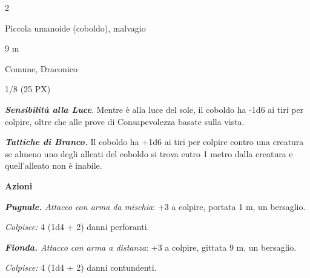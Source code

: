 \begin{multicols}{2}
{
\begin{description}[noitemsep, topsep=0pt, parsep=0pt, partopsep=0pt, itemsep=1pt, leftmargin=2.35cm,  labelwidth=2.2cm, itemindent=0cm, listparindent=0pt] %
\setlength{\baselineskip}{10pt}
\item[\textbf{Taglia/Tipo}] Piccola umanoide (coboldo), malvagio
\item[\textbf{Caratt.}] 
\item[\textbf{Punti Ferita}] 
\item[\textbf{Movimento}] 9 m
\item[\textbf{Tiri Salvez.}] 
\item[\textbf{Sensi}] 
\item[\textbf{Linguaggi}] Comune, Draconico
\item[\textbf{Sfida}] 1/8 (25 PX)
\end{description}
\smallskip

\emph{\textbf{Sensibilità alla Luce}}. Mentre è alla luce del sole, il coboldo ha -1d6 ai tiri per colpire, oltre che alle prove di Consapevolezza basate sulla vista.

\emph{\textbf{Tattiche di Branco.}} Il coboldo ha +1d6 ai tiri per colpire contro una creatura se almeno uno degli alleati del coboldo si trova entro 1 metro dalla creatura e quell'alleato non è inabile.

\textbf{Azioni}

\emph{\textbf{Pugnale.} Attacco con arma da mischia}: +3 a colpire, portata 1 m, un bersaglio.

\emph{Colpisce:} 4 (1d4 + 2) danni perforanti.

\emph{\textbf{Fionda.} Attacco con arma a distanza}: +3 a colpire, gittata 9 m, un bersaglio.

\emph{Colpisce:} 4 (1d4 + 2) danni contundenti.

}
\end{multicols}
